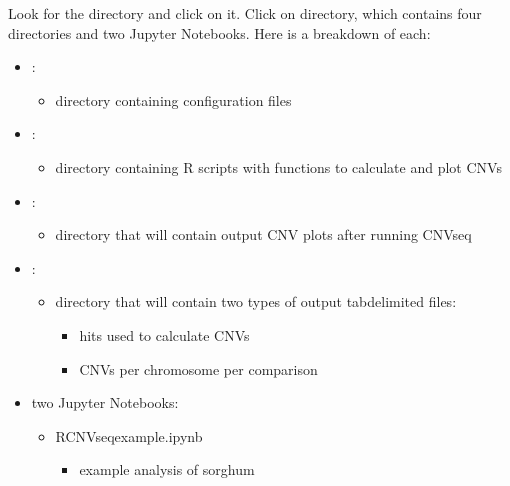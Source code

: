 \documentclass[letterpaper,10pt,english]{sphinxhowto}
\begin{document}
\sphinxAtStartPar
Look for the directory  and click on it. Click on  directory, which contains four directories and two Jupyter Notebooks. Here is a breakdown of each:
\begin{itemize}
\item {} 
\sphinxAtStartPar
{}:
\begin{itemize}
\item {} 
\sphinxAtStartPar
directory containing configuration files

\end{itemize}

\item {} 
\sphinxAtStartPar
{}:
\begin{itemize}
\item {} 
\sphinxAtStartPar
directory containing R scripts with functions to calculate and plot CNVs

\end{itemize}

\item {} 
\sphinxAtStartPar
{}:
\begin{itemize}
\item {} 
\sphinxAtStartPar
directory that will contain output CNV plots after running CNV\sphinxhyphen{}seq

\end{itemize}

\item {} 
\sphinxAtStartPar
{}:
\begin{itemize}
\item {} 
\sphinxAtStartPar
directory that will contain two types of output tab\sphinxhyphen{}delimited files:
\begin{itemize}
\item {} 
\sphinxAtStartPar
hits used to calculate CNVs

\item {} 
\sphinxAtStartPar
CNVs per chromosome per comparison

\end{itemize}

\end{itemize}

\item {} 
\sphinxAtStartPar
two Jupyter Notebooks:
\begin{itemize}
\item {} 
\sphinxAtStartPar
RCNV\sphinxhyphen{}seq\sphinxhyphen{}example.ipynb
\begin{itemize}
\item {} 
\sphinxAtStartPar
example analysis of sorghum


\end{itemize}
\end{itemize}
\end{itemize}
\end{document}
